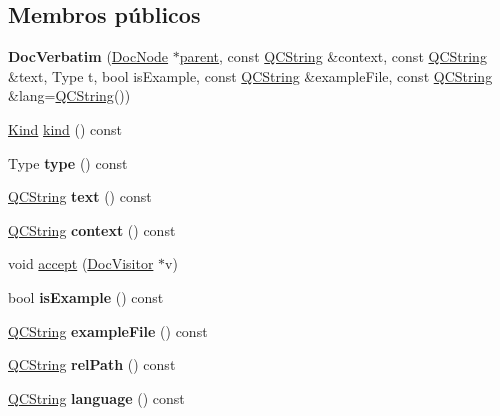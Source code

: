 \subsection*{Membros públicos}
\begin{DoxyCompactItemize}
\item 
\hypertarget{class_doc_verbatim_a5b274aae17b72b09d195e58678f2a5f5}{{\bfseries Doc\-Verbatim} (\hyperlink{class_doc_node}{Doc\-Node} $\ast$\hyperlink{class_doc_node_abd7f070d6b0a38b4da71c2806578d19d}{parent}, const \hyperlink{class_q_c_string}{Q\-C\-String} \&context, const \hyperlink{class_q_c_string}{Q\-C\-String} \&text, Type t, bool is\-Example, const \hyperlink{class_q_c_string}{Q\-C\-String} \&example\-File, const \hyperlink{class_q_c_string}{Q\-C\-String} \&lang=\hyperlink{class_q_c_string}{Q\-C\-String}())}\label{class_doc_verbatim_a5b274aae17b72b09d195e58678f2a5f5}

\item 
\hyperlink{class_doc_node_aa10c9e8951b8ccf714a59ec321bdac5b}{Kind} \hyperlink{class_doc_verbatim_aa9d037bed9f9a083d0cd01485637d843}{kind} () const 
\item 
\hypertarget{class_doc_verbatim_afbd0fa31db28593e9669c3c56711c0a7}{Type {\bfseries type} () const }\label{class_doc_verbatim_afbd0fa31db28593e9669c3c56711c0a7}

\item 
\hypertarget{class_doc_verbatim_a367883e6ba4151924745ee021c01b5e7}{\hyperlink{class_q_c_string}{Q\-C\-String} {\bfseries text} () const }\label{class_doc_verbatim_a367883e6ba4151924745ee021c01b5e7}

\item 
\hypertarget{class_doc_verbatim_a4d6bb4ed13678cf22ef5cb414076d9f5}{\hyperlink{class_q_c_string}{Q\-C\-String} {\bfseries context} () const }\label{class_doc_verbatim_a4d6bb4ed13678cf22ef5cb414076d9f5}

\item 
void \hyperlink{class_doc_verbatim_a7ba716e854ae2f8f87a4eb2140e302b6}{accept} (\hyperlink{class_doc_visitor}{Doc\-Visitor} $\ast$v)
\item 
\hypertarget{class_doc_verbatim_ae2846c41642c97e04ab0f3e354c3edc0}{bool {\bfseries is\-Example} () const }\label{class_doc_verbatim_ae2846c41642c97e04ab0f3e354c3edc0}

\item 
\hypertarget{class_doc_verbatim_ab8e6a9216fc7af8e172e0b929f523cb2}{\hyperlink{class_q_c_string}{Q\-C\-String} {\bfseries example\-File} () const }\label{class_doc_verbatim_ab8e6a9216fc7af8e172e0b929f523cb2}

\item 
\hypertarget{class_doc_verbatim_a3aa6799d4713d51d9cc4862af165671c}{\hyperlink{class_q_c_string}{Q\-C\-String} {\bfseries rel\-Path} () const }\label{class_doc_verbatim_a3aa6799d4713d51d9cc4862af165671c}

\item 
\hypertarget{class_doc_verbatim_ae212ea32dc6fd91f6b870d81f253a306}{\hyperlink{class_q_c_string}{Q\-C\-String} {\bfseries language} () const }\label{class_doc_verbatim_ae212ea32dc6fd91f6b870d81f253a306}

\end{DoxyCompactItemize}
